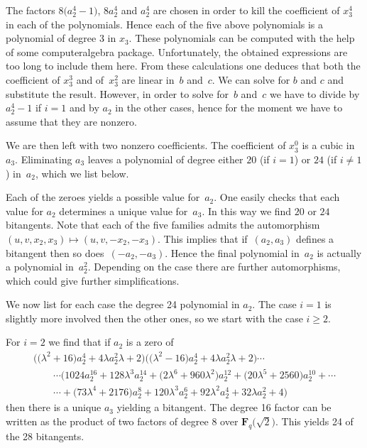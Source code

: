 \documentclass[pdftex]{sigma}
\numberwithin{equation}{section}
\begin{document}
The factors $8\big(a_2^ 4-1\big)$, $8a_2^ 4$ and $a_2^4$ are chosen in order to kill the coef\/f\/icient of $x_3^4$ in each of the polynomials. Hence each of the f\/ive above polynomials is a polynomial of degree 3 in $x_3$. These polynomials can be computed with the help of some computeralgebra package. Unfortunately, the obtained expressions are too long to include them here. From these calculations one deduces that both the coef\/f\/icient of $x_3^3$ and of~$x_3^2$ are linear in~$b$ and~$c$. We can solve for $b$ and $c$ and substitute the result. However, in order to solve for~$b$ and~$c$ we have to divide by $a_2^4-1$ if $i=1$ and by $a_2$ in the other cases, hence for the moment we have to assume that they are nonzero.

We are then left with two nonzero coef\/f\/icients. The coef\/f\/icient of $x_3^0$ is a cubic in $a_3$. Eliminating $a_3$ leaves a polynomial of degree either $20$ (if $i=1$) or $24$ (if $i\neq 1$) in~$a_2$, which we list below.

Each of the zeroes yields a possible value for~$a_2$. One easily checks that each value for $a_2$ determines a unique value for~$a_3$. In this way we f\/ind $20$ or $24$ bitangents. Note that each of the f\/ive families admits the automorphism $(u,v,x_2,x_3)\mapsto (u,v,-x_2,-x_3)$. This implies that if~$(a_2,a_3)$ def\/ines a bitangent then so does~$(-a_2,-a_3)$. Hence the f\/inal polynomial in~$a_2$ is actually a polynomial in~$a_2^2$. Depending on the case there are further automorphisms, which could give further simplif\/ications.

We now list for each case the degree 24 polynomial in $a_2$. The case $i=1$ is slightly more involved then the other ones, so we start with the case $i\geq 2$.

For $i=2$ we f\/ind that if $a_2$ is a zero of
 \begin{gather*}
 \big(\big(\lambda^2+16\big)a_2^4+4\lambda a_2^2\lambda+2\big)\big(\big(\lambda^2-16\big)a_2^4+4\lambda a_2^2\lambda+2\big) \cdots \\
\qquad {} \cdots \big(1024 a_2^{16}+128 \lambda^3 a_2^{14}+\big(2\lambda^6+960\lambda^2\big)a_2^{12}+\big(20\lambda^5+2560\big) a_2^{10}+\cdots\\
\qquad{} \cdots + \big(73\lambda^4 +2176\big) a_2^{8}+120\lambda^3a_2^{6}+92\lambda^2 a_2^{4}+32\lambda a_2^{2}+4\big) \end{gather*}
then there is a unique $a_3$ yielding a bitangent. The degree 16 factor can be written as the product of two factors of degree 8 over $\mathbf{F}_q\big(\sqrt{2}\big)$. This yields 24 of the 28 bitangents.
\end{document}
